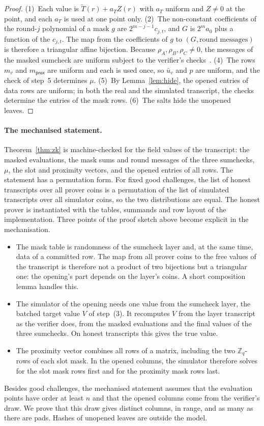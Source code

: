 \documentclass[sigconf,anonymous]{acmart}
\newcommand{\Zq}{\mathbb{Z}_q}
\newcommand{\mle}[1]{\widetilde{#1}}
\begin{document}
\begin{proof}
(1)~Each value is $\mle{T}(r)+a_TZ(r)$ with $a_T$ uniform and $Z\ne 0$ at the point, and each
$a_T$ is used at one point only. (2)~The non-constant coefficients of the round-$j$ polynomial of a
mask $g$ are $2^{m-j-1}c_{j,t}$, and $G$ is $2^m a_0$ plus a function of the $c_{j,t}$. The map
from the coefficients of $g$ to $(G,\text{round messages})$ is therefore a triangular affine
bijection. Because $\rho_A,\rho_B,\rho_C\neq 0$, the messages of the masked sumcheck are uniform
subject to the verifier's checks~\cite{CFS17,Libra}. (4)~The rows $m_v$ and $m_{\mathsf{prox}}$ are
uniform and each is used once, so $\bar u_v$ and $p$ are uniform, and the check of step~5 determines
$\mu$. (5)~By Lemma~\ref{lem:hide}, the opened entries of data rows are uniform; in both the real and
the simulated transcript, the checks determine the entries of the mask rows. (6)~The salts hide the
unopened leaves.
\end{proof}

\paragraph{The mechanised statement.}
Theorem~\ref{thm:zk} is machine-checked for the field values of the transcript: the masked
evaluations, the mask sums and round messages of the three sumchecks, $\mu$, the slot and
proximity vectors, and the opened entries of all rows. The statement has a permutation form. For
fixed good challenges, the list of honest transcripts over all prover coins is a permutation of the
list of simulated transcripts over all simulator coins, so the two distributions are equal. The
honest prover is instantiated with the tables, summands and row layout of the implementation. Three
points of the proof sketch above become explicit in the mechanisation.
\begin{itemize}[leftmargin=1.2em,itemsep=1pt,topsep=3pt]
\item The mask table is randomness of the sumcheck layer and, at the same time, data of a committed
  row. The map from all prover coins to the free values of the transcript is therefore not a product
  of two bijections but a triangular one: the opening's part depends on the layer's coins. A short
  composition lemma handles this.
\item The simulator of the opening needs one value from the sumcheck layer, the batched target
  value $V$ of step~(3). It recomputes $V$ from the layer transcript as the verifier does, from the
  masked evaluations and the final values of the three sumchecks. On honest transcripts this gives
  the true value.
\item The proximity vector combines all rows of a matrix, including the two $\Zq$-rows of each slot
  mask. In the opened columns, the simulator therefore solves for the slot mask rows first and for
  the proximity mask rows last.
\end{itemize}
Besides good challenges, the mechanised statement assumes that the evaluation points have order at
least $n$ and that the opened columns come from the verifier's draw. We prove that this draw gives
distinct columns, in range, and as many as there are pads. Hashes of unopened leaves are outside the
model.
\end{document}

